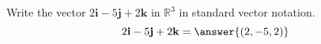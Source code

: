\begin{problem}
Write the vector $2\mathbf{i}-5\mathbf{j}+2\mathbf{k}$ in $\mathbb{R}^3$ in standard vector notation.
\[
2\mathbf{i}-5\mathbf{j}+2\mathbf{k}=\answer{(2,-5,2)}
\]

\end{problem}